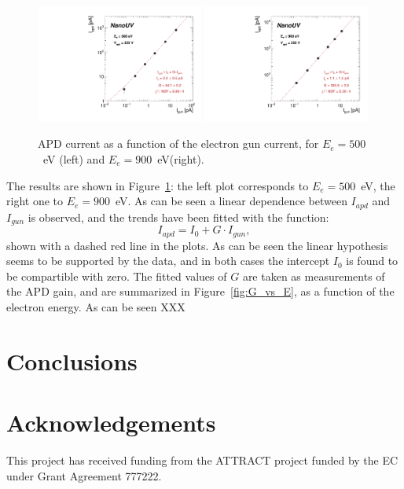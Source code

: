 \documentclass[12p]{paper}
\begin{document}
\begin{figure}[htb]
  \centering
  \includegraphics[width=0.49\textwidth]{figures/iapd_vs_igun_E500_V350}
  \includegraphics[width=0.49\textwidth]{figures/iapd_vs_igun_E900_V350}
 \caption{APD current as a function of the electron gun current, for $E_{e} = 500$~eV (left) and $E_{e} = 900$~eV(right).
  \label{fig:i_vs_i}}
\end{figure}

The results are shown in Figure~\ref{fig:i_vs_i}: the left plot corresponds to $E_{e} = 500$~eV, the right one to $E_{e} = 900$~eV. As can be seen a linear dependence between $I_{apd}$ and $I_{gun}$ is observed, and the trends have been fitted with the function:
$$
I_{apd} = I_0 + G\cdot I_{gun},
$$
shown with a dashed red line in the plots. As can be seen the linear hypothesis seems to be supported by the data, and in both cases the intercept $I_0$ is found to be compartible with zero. The fitted values of $G$ are taken as measurements of the APD gain, and are summarized in Figure~\ref{fig:G_vs_E}, as a function of the electron energy. As can be seen XXX


\section{Conclusions}

\section*{Acknowledgements}

This project has received funding from the ATTRACT project funded by the EC under Grant Agreement 777222.
\end{document}
